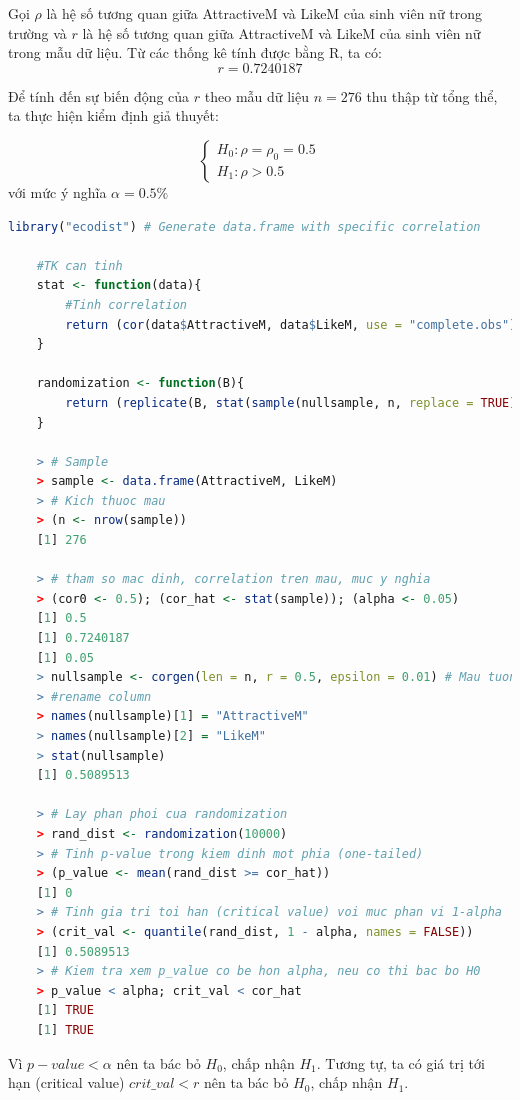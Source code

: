 \documentclass[a4paper,12pt]{article}
\begin{document}
	Gọi $\rho$ là hệ số tương quan giữa AttractiveM và LikeM của sinh viên nữ trong trường và $r$ là hệ số tương quan giữa AttractiveM và LikeM của sinh viên nữ trong mẫu dữ liệu. Từ các thống kê tính được bằng R, ta có: $$r = 0.7240187$$
	
	Để tính đến sự biến động của $r$ theo mẫu dữ liệu $n = 276$ thu thập từ tổng thể, ta thực hiện kiểm định giả thuyết:
	
	\begin{equation*}
	\begin{cases}
	H_0: \rho = \rho_0 = 0.5\\
	H_1: \rho > 0.5
	\end{cases}
	\end{equation*}
	với mức ý nghĩa $\alpha = 0.5\%$
	
	\begin{lstlisting}[language=R]
	library("ecodist") # Generate data.frame with specific correlation
	
	#TK can tinh
	stat <- function(data){
		#Tinh correlation
		return (cor(data$AttractiveM, data$LikeM, use = "complete.obs")) # Avoid missing values
	}
	
	randomization <- function(B){
		return (replicate(B, stat(sample(nullsample, n, replace = TRUE))))
	}
	
	> # Sample
	> sample <- data.frame(AttractiveM, LikeM)
	> # Kich thuoc mau
	> (n <- nrow(sample))
	[1] 276
	 
	> # tham so mac dinh, correlation tren mau, muc y nghia
	> (cor0 <- 0.5); (cor_hat <- stat(sample)); (alpha <- 0.05)
	[1] 0.5
	[1] 0.7240187
	[1] 0.05
	> nullsample <- corgen(len = n, r = 0.5, epsilon = 0.01) # Mau tuong thich voi H0
	> #rename column
	> names(nullsample)[1] = "AttractiveM"
	> names(nullsample)[2] = "LikeM"
	> stat(nullsample)
	[1] 0.5089513
	 
	> # Lay phan phoi cua randomization
	> rand_dist <- randomization(10000)
	> # Tinh p-value trong kiem dinh mot phia (one-tailed)
	> (p_value <- mean(rand_dist >= cor_hat))
	[1] 0
	> # Tinh gia tri toi han (critical value) voi muc phan vi 1-alpha
	> (crit_val <- quantile(rand_dist, 1 - alpha, names = FALSE))
	[1] 0.5089513
	> # Kiem tra xem p_value co be hon alpha, neu co thi bac bo H0
	> p_value < alpha; crit_val < cor_hat
	[1] TRUE
	[1] TRUE
	\end{lstlisting}
	
	Vì $p-value < \alpha$ nên ta bác bỏ $H_0$, chấp nhận $H_1$. Tương tự, ta có giá trị tới hạn (critical value) $crit\_val < r$ nên ta bác bỏ $H_0$, chấp nhận $H_1$. 
	
\end{document}
